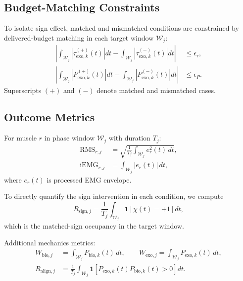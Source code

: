 \documentclass[lettersize,journal]{IEEEtran}
\begin{document}
\subsection{Budget-Matching Constraints}
To isolate sign effect, matched and mismatched conditions are constrained by delivered-budget matching in each target window $\mathcal{W}_j$:
\begin{align}
\left|\int_{\mathcal{W}_j}\!|\tau^{(+)}_{\mathrm{exo},k}(t)|dt-
\int_{\mathcal{W}_j}\!|\tau^{(-)}_{\mathrm{exo},k}(t)|dt\right| &\le \epsilon_{\tau},
\label{eq:match_tau}\\
\left|\int_{\mathcal{W}_j}\!|P^{(+)}_{\mathrm{exo},k}(t)|dt-
\int_{\mathcal{W}_j}\!|P^{(-)}_{\mathrm{exo},k}(t)|dt\right| &\le \epsilon_{P}.
\label{eq:match_power}
\end{align}
Superscripts $(+)$ and $(-)$ denote matched and mismatched cases.

\subsection{Outcome Metrics}
For muscle $r$ in phase window $\mathcal{W}_j$ with duration $T_j$:
\begin{align}
\mathrm{RMS}_{r,j} &=
\sqrt{\frac{1}{T_j}\int_{\mathcal{W}_j} e_r^2(t)\,dt},
\label{eq:rms}\\
\mathrm{iEMG}_{r,j} &=
\int_{\mathcal{W}_j} |e_r(t)|\,dt,
\label{eq:iemg}
\end{align}
where $e_r(t)$ is processed EMG envelope.

To directly quantify the sign intervention in each condition, we compute
\begin{equation}
R_{\mathrm{sign},j}=
\frac{1}{T_j}\int_{\mathcal{W}_j}\mathbf{1}\!\left[\chi(t)=+1\right]dt,
\label{eq:rsign}
\end{equation}
which is the matched-sign occupancy in the target window.

Additional mechanics metrics:
\begin{align}
W_{\mathrm{bio},j} &= \int_{\mathcal{W}_j} P_{\mathrm{bio},k}(t)\,dt,
\qquad
W_{\mathrm{exo},j}=\int_{\mathcal{W}_j} P_{\mathrm{exo},k}(t)\,dt,
\label{eq:work_terms}\\
R_{\mathrm{align},j} &=
\frac{1}{T_j}\int_{\mathcal{W}_j}
\mathbf{1}\!\left[P_{\mathrm{exo},k}(t)P_{\mathrm{bio},k}(t)>0\right]dt.
\label{eq:align_ratio}
\end{align}
\end{document}
